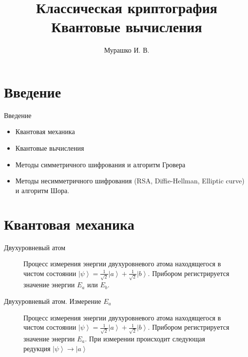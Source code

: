 \documentclass[10pt,pdf,hyperref={unicode}]{beamer}
\title[Криптография и квантовые вычисления]{Классическая
  криптография\\Квантовые вычисления}
\author{Мурашко И. В.}
\date{}
\begin{document}
\begin{frame}
\titlepage
\end{frame}


\section{Введение}

\begin{frame}{Введение}
\begin{itemize}
\item Квантовая механика
\item Квантовые вычисления
\item Методы симметричного шифрования и алгоритм Гровера
\item Методы несимметричного шифрования (RSA, Diffie-Hellman, Elliptic
curve) и алгоритм Шора.
\end{itemize}
\end{frame}

\section{Квантовая механика}
\begin{frame}{Двухуровневый атом}
\begin{figure}
\centering



\caption{Процесс измерения энергии двухуровневого атома находящегося в
чистом состоянии $\left|\psi\right> = 
\frac{1}{\sqrt{2}}\left|a\right> + \frac{1}{\sqrt{2}}\left|b\right>$.
Прибором регистрируется значение энергии $E_a$ или $E_b$.
}
\label{fig:add:mesure_ex}
\end{figure}
\end{frame}

\begin{frame}{Двухуровневый атом. Измерение $E_a$}
\begin{figure}
\centering



\caption{Процесс измерения энергии двухуровневого атома находящегося в
чистом состоянии $\left|\psi\right> = 
\frac{1}{\sqrt{2}}\left|a\right> + \frac{1}{\sqrt{2}}\left|b\right>$.
Прибором регистрируется значение энергии $E_a$. При измерении
происходит следующая редукция $\left|\psi\right> \to \left|a\right>$
}
\label{fig:add:mesure_ex_a}
\end{figure}
\end{frame}
\end{document}

